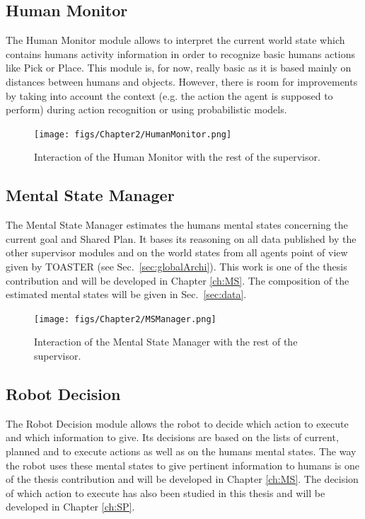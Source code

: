 \documentclass[english,a4paper,11pt,twoside]{StyleThese}
\begin{document}
\subsection{Human Monitor}

The Human Monitor module allows to interpret the current world state which contains humans activity information in order to recognize basic humans actions like Pick or Place. This module is, for now, really basic as it is based mainly on distances between humans and objects. However, there is room for improvements by taking into account the context (e.g. the action the agent is supposed to perform) during action recognition or using probabilistic models.


\begin{figure}[!h]
	\centering
    \texttt{[image: figs/Chapter2/HumanMonitor.png]}
    \caption{Interaction of the Human Monitor with the rest of the supervisor.}
    \label{fig:humanMonitor}
\end{figure}

\subsection{Mental State Manager}

The Mental State Manager estimates the humans mental states concerning the current goal and Shared Plan. It bases its reasoning on all data published by the other supervisor modules and on the world states from all agents point of view given by TOASTER (see Sec.~\ref{sec:globalArchi}). This work is one of the thesis contribution and will be developed in Chapter \ref{ch:MS}. The composition of the estimated mental states will be given in Sec.~\ref{sec:data}. 

\begin{figure}[!h]
	\centering
    \texttt{[image: figs/Chapter2/MSManager.png]}
    \caption{Interaction of the Mental State Manager with the rest of the supervisor.}
    \label{fig:MSManager}
\end{figure}

\subsection{Robot Decision}

The Robot Decision module allows the robot to decide which action to execute and which information to give. Its decisions are based on the lists of current, planned and to execute actions as well as on the humans mental states. The way the robot uses these mental states to give pertinent information to humans is one of the thesis contribution and will be developed in Chapter \ref{ch:MS}. The decision of which action to execute has also been studied in this thesis and will be developed in Chapter \ref{ch:SP}.
\end{document}
